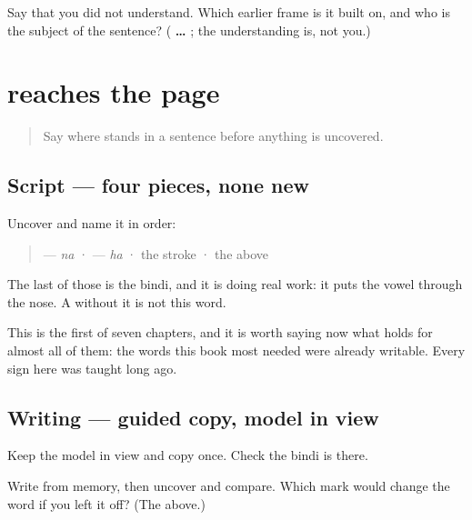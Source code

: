 \begin{tcolorbox}[breakable,colback=teal!4,colframe=teal!35!black,title={Before you move on}]
Say that you did not understand. Which earlier frame is it built on, and who is the subject of the sentence? (\textbf{ …  }; the understanding is, not you.)
\end{tcolorbox}
\section[\texorpdfstring{\pa{ਨਹੀਂ} (nahī̃)}{ਨਹੀਂ (nahī̃)}]{ reaches the page}

\label{lesson:PA-C37-nahin-write}



\begin{quote}
Say where \textbf{} stands in a sentence before anything is uncovered.
\end{quote}

\subsection*{Script — four pieces, none new}
Uncover \textbf{} and name it in order:

\begin{quote}
\textbf{} — \emph{na} · \textbf{} — \emph{ha} · the \textbf{} stroke · the \textbf{} above
\end{quote}

The last of those is the bindi, and it is doing real work: it puts the vowel through the nose. A \textbf{} without it is not this word.

This is the first of seven chapters, and it is worth saying now what holds for almost all of them: the words this book most needed were already writable. Every sign here was taught long ago.

\subsection*{Writing — guided copy, model in view}
Keep the model in view and copy \textbf{} once. Check the bindi is there.

\begin{tcolorbox}[breakable,colback=teal!4,colframe=teal!35!black,title={Before you move on}]
Write \textbf{} from memory, then uncover and compare. Which mark would change the word if you left it off? (The \textbf{} above.)
\end{tcolorbox}
